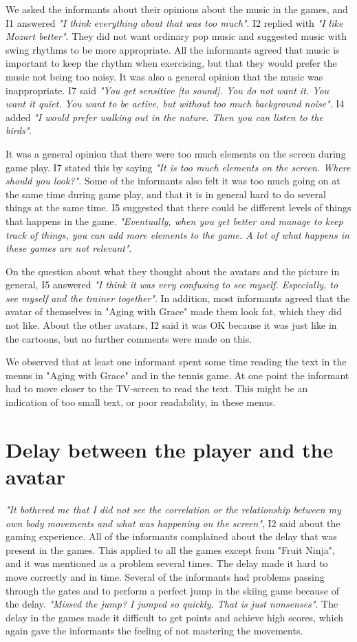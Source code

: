 We asked the informants about their opinions about the music in the games, and I1 answered \emph{"I think everything about that was too much"}. I2 replied with \emph{"I like Mozart better"}. They did not want ordinary pop music and suggested music with swing rhythms to be more appropriate. All the informants agreed that music is important to keep the rhythm when exercising, but that they would prefer the music not being too noisy. It was also a general opinion that the music was inappropriate.  I7 said \emph{"You get sensitive [to sound]. You do not want it. You want it quiet. You want to be active, but without too much background noise"}. I4 added \emph{"I would prefer walking out in the nature. Then you can listen to the birds"}.

It was a general opinion that there were too much elements on the screen during game play. I7 stated this by saying \emph{"It is too much elements on the screen. Where should you look?"}. Some of the informants also felt it was too much going on at the same time during game play, and that it is in general hard to do several things at the same time. I5 suggested that there could be different levels of things that happens in the game.  \emph{"Eventually, when you get better and manage to keep track of things, you can add more elements to the game. A lot of what happens in these games are not relevant"}. 

On the question about what they thought about the avatars and the picture in general, I5 answered \emph{"I think it was very confusing to see myself. Especially, to see myself and the trainer together"}. In addition, most informants agreed that the avatar of themselves in "Aging with Grace" made them look fat, which they did not like. About the other avatars, I2 said it was OK because it was just like in the cartoons, but no further comments were made on this.  

We observed that at least one informant spent some time reading the text in the menus in "Aging with Grace" and in the tennis game. At one point the informant had to move closer to the TV-screen to read the text. This might be an indication of too small text, or poor readability, in these menus. 

\section{Delay between the player and the avatar}

\emph{"It bothered me that I did not see the correlation or the relationship between my own body movements and what was happening on the screen"}, I2 said about the gaming experience. All of the informants complained about the delay that was present in the games. This applied to all the games except from "Fruit Ninja", and it was mentioned as a problem several times. The delay made it hard to move correctly and in time. Several of the informants had problems passing through the gates and to perform a perfect jump in the skiing game because of the delay. \emph{"Missed the jump? I jumped so quickly. That is just nonsenses"}. The delay in the games made it difficult to get points and achieve high scores, which again gave the informants the feeling of not mastering the movements. 


